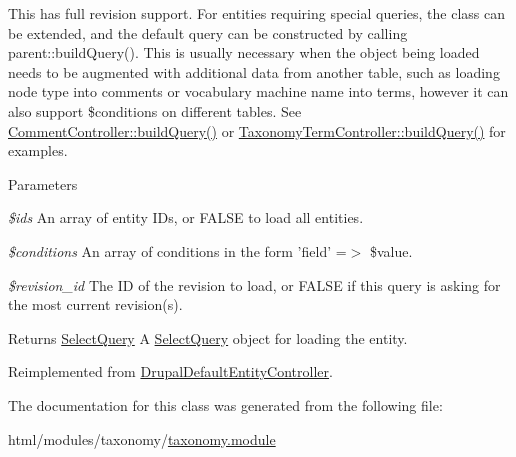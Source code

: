This has full revision support. For entities requiring special queries, the class can be extended, and the default query can be constructed by calling parent::buildQuery(). This is usually necessary when the object being loaded needs to be augmented with additional data from another table, such as loading node type into comments or vocabulary machine name into terms, however it can also support \$conditions on different tables. See \hyperlink{classCommentController_a0feb93a67f87f04b06eb64eb0d359ca7}{CommentController::buildQuery()} or \hyperlink{classTaxonomyTermController_a38102da86b43fb5b2c3c3412cb2ba3d2}{TaxonomyTermController::buildQuery()} for examples.


\begin{DoxyParams}{Parameters}
\item[{\em \$ids}]An array of entity IDs, or FALSE to load all entities. \item[{\em \$conditions}]An array of conditions in the form 'field' =$>$ \$value. \item[{\em \$revision\_\-id}]The ID of the revision to load, or FALSE if this query is asking for the most current revision(s).\end{DoxyParams}
\begin{DoxyReturn}{Returns}
\hyperlink{classSelectQuery}{SelectQuery} A \hyperlink{classSelectQuery}{SelectQuery} object for loading the entity. 
\end{DoxyReturn}


Reimplemented from \hyperlink{classDrupalDefaultEntityController_aaa882d053aa4e04e2816b0093b79b0f8}{DrupalDefaultEntityController}.

The documentation for this class was generated from the following file:\begin{DoxyCompactItemize}
\item 
html/modules/taxonomy/\hyperlink{taxonomy_8module}{taxonomy.module}\end{DoxyCompactItemize}
